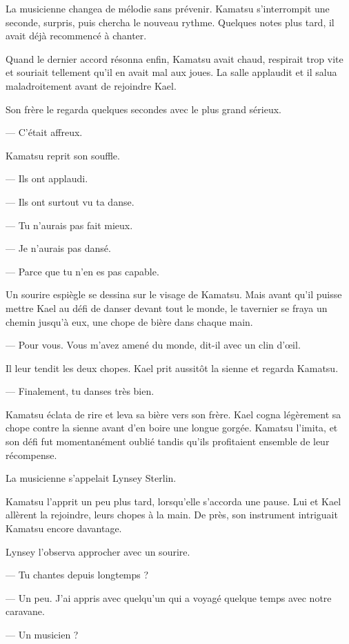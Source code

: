 La musicienne changea de mélodie sans prévenir. Kamatsu s'interrompit une
seconde, surpris, puis chercha le nouveau rythme. Quelques notes plus tard, il
avait déjà recommencé à chanter.

Quand le dernier accord résonna enfin, Kamatsu avait chaud, respirait trop
vite et souriait tellement qu'il en avait mal aux joues. La salle applaudit
et il salua maladroitement avant de rejoindre Kael.

Son frère le regarda quelques secondes avec le plus grand sérieux.

— C'était affreux.

Kamatsu reprit son souffle.

— Ils ont applaudi.

— Ils ont surtout vu ta danse.

— Tu n'aurais pas fait mieux.

— Je n'aurais pas dansé.

— Parce que tu n'en es pas capable.

Un sourire espiègle se dessina sur le visage de Kamatsu. Mais avant qu'il
puisse mettre Kael au défi de danser devant tout le monde, le tavernier se
fraya un chemin jusqu'à eux, une chope de bière dans chaque main.

— Pour vous. Vous m'avez amené du monde, dit-il avec un clin d'œil.

Il leur tendit les deux chopes. Kael prit aussitôt la sienne et regarda
Kamatsu.

— Finalement, tu danses très bien.

Kamatsu éclata de rire et leva sa bière vers son frère. Kael cogna légèrement
sa chope contre la sienne avant d'en boire une longue gorgée. Kamatsu l'imita,
et son défi fut momentanément oublié tandis qu'ils profitaient ensemble de
leur récompense.

\scenebreak

La musicienne s'appelait Lynsey Sterlin.

Kamatsu l'apprit un peu plus tard, lorsqu'elle s'accorda une pause. Lui et Kael
allèrent la rejoindre, leurs chopes à la main. De près, son instrument
intriguait Kamatsu encore davantage.

Lynsey l'observa approcher avec un sourire.

— Tu chantes depuis longtemps ?

— Un peu. J'ai appris avec quelqu'un qui a voyagé quelque temps avec notre
caravane.

— Un musicien ?

